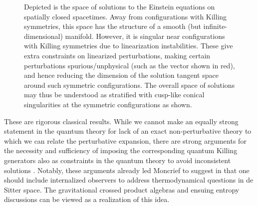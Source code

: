 \documentclass[]{jkpaper}
\theoremstyle{plain}
\theoremstyle{definition}
\begin{document}
\begin{figure}
    \centering
    \caption{Depicted is the space of solutions to the Einstein equations on spatially closed spacetimes. Away from configurations with Killing symmetries, this space has the structure of a smooth (but infinite-dimensional) manifold. However, it is singular near configurations with Killing symmetries due to linearization instabilities. These give extra constraints on linearized perturbations, making certain perturbations spurious/unphysical (such as the vector shown in \textcolor{red!80!white}{red}), and hence reducing the dimension of the solution tangent space around such symmetric configurations. The overall space of solutions may thus be understood as stratified with cusp-like conical singularities at the symmetric configurations as shown.}
    \label{Figure: linearization instability singularities}
\end{figure}

These are rigorous classical results. While we cannot make an equally strong statement in the quantum theory for lack of an exact non-perturbative theory to which we can relate the perturbative expansion, there are strong arguments for the necessity and sufficiency of imposing the corresponding quantum Killing generators also as constraints in the quantum theory to avoid inconsistent solutions \cite{Moncrief:1978te,Moncrief:1979bg,Higuchi:1991tk,Higuchi:1991tm,Losic:2006ht}. Notably, these arguments already led Moncrief to suggest in \cite{Moncrief:1978te,Moncrief:1979bg} that one should include internalized observers to address thermodynamical questions in de Sitter space. The gravitational crossed product algebras and ensuing entropy discussions can be viewed as a realization of this idea.
\end{document}
